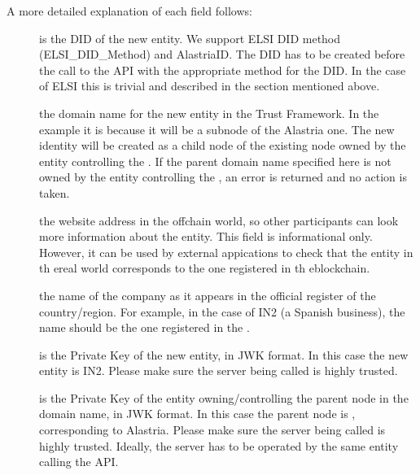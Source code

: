 \documentclass[letterpaper,10pt,english]{sphinxmanual}
\begin{document}
\sphinxAtStartPar
A more detailed explanation of each field follows:
\begin{description}
\item[{}] \leavevmode
\sphinxAtStartPar
is the DID of the new entity. We support ELSI DID method (ELSI\_DID\_Method) and AlastriaID. The DID has to be created before the call to the API with the appropriate method for the DID. In the case of ELSI this is trivial and described in the section mentioned above.

\item[{}] \leavevmode
\sphinxAtStartPar
the domain name for the new entity in the Trust Framework. In the example it is  because it will be a sub\sphinxhyphen{}node of the Alastria one. The new identity will be created as a child node of the existing node owned by the entity controlling the . If the parent domain name specified here is not owned by the entity controlling the , an error is returned and no action is taken.

\item[{}] \leavevmode
\sphinxAtStartPar
the website address in the off\sphinxhyphen{}chain world, so other participants can look more information about the entity. This field is informational only. However, it can be used by external appications to check that the entity in th ereal world corresponds to the one registered in th eblockchain.

\item[{}] \leavevmode
\sphinxAtStartPar
the name of the company as it appears in the official register of the country/region. For example, in the case of IN2 (a Spanish business), the name should be the one registered in the .

\item[{}] \leavevmode
\sphinxAtStartPar
is the Private Key of the new entity, in JWK format. In this case the new entity is IN2. Please make sure the server being called is highly trusted.

\item[{}] \leavevmode
\sphinxAtStartPar
is the Private Key of the entity owning/controlling the parent node in the domain name, in JWK format. In this case the parent node is , corresponding to Alastria. Please make sure the server being called is highly trusted. Ideally, the server has to be operated by the same entity calling the API.

\end{description}
\end{document}
